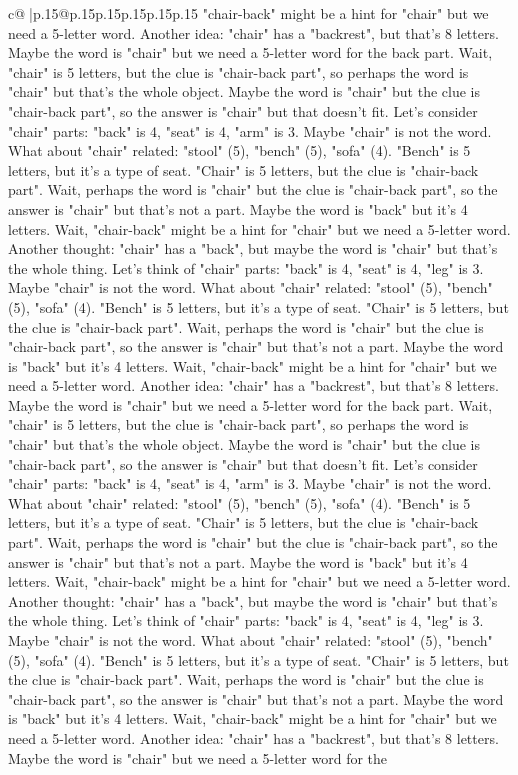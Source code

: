 \documentclass{article}
\begin{document}
{\begin{supertabular}{c@{$\;$}|p{.15\linewidth}@{}p{.15\linewidth}p{.15\linewidth}p{.15\linewidth}p{.15\linewidth}p{.15\linewidth}}
{{{"chair{-}back" might be a hint for "chair" but we need a 5{-}letter word. Another idea: "chair" has a "backrest", but that's 8 letters. Maybe the word is "chair" but we need a 5{-}letter word for the back part. Wait, "chair" is 5 letters, but the clue is "chair{-}back part", so perhaps the word is "chair" but that's the whole object. Maybe the word is "chair" but the clue is "chair{-}back part", so the answer is "chair" but that doesn't fit. Let's consider "chair" parts: "back" is 4, "seat" is 4, "arm" is 3. Maybe "chair" is not the word. What about "chair" related: "stool" (5), "bench" (5), "sofa" (4). "Bench" is 5 letters, but it's a type of seat. "Chair" is 5 letters, but the clue is "chair{-}back part". Wait, perhaps the word is "chair" but the clue is "chair{-}back part", so the answer is "chair" but that's not a part. Maybe the word is "back" but it's 4 letters. Wait, "chair{-}back" might be a hint for "chair" but we need a 5{-}letter word. Another thought: "chair" has a "back", but maybe the word is "chair" but that's the whole thing. Let's think of "chair" parts: "back" is 4, "seat" is 4, "leg" is 3. Maybe "chair" is not the word. What about "chair" related: "stool" (5), "bench" (5), "sofa" (4). "Bench" is 5 letters, but it's a type of seat. "Chair" is 5 letters, but the clue is "chair{-}back part". Wait, perhaps the word is "chair" but the clue is "chair{-}back part", so the answer is "chair" but that's not a part. Maybe the word is "back" but it's 4 letters. Wait, "chair{-}back" might be a hint for "chair" but we need a 5{-}letter word. Another idea: "chair" has a "backrest", but that's 8 letters. Maybe the word is "chair" but we need a 5{-}letter word for the back part. Wait, "chair" is 5 letters, but the clue is "chair{-}back part", so perhaps the word is "chair" but that's the whole object. Maybe the word is "chair" but the clue is "chair{-}back part", so the answer is "chair" but that doesn't fit. Let's consider "chair" parts: "back" is 4, "seat" is 4, "arm" is 3. Maybe "chair" is not the word. What about "chair" related: "stool" (5), "bench" (5), "sofa" (4). "Bench" is 5 letters, but it's a type of seat. "Chair" is 5 letters, but the clue is "chair{-}back part". Wait, perhaps the word is "chair" but the clue is "chair{-}back part", so the answer is "chair" but that's not a part. Maybe the word is "back" but it's 4 letters. Wait, "chair{-}back" might be a hint for "chair" but we need a 5{-}letter word. Another thought: "chair" has a "back", but maybe the word is "chair" but that's the whole thing. Let's think of "chair" parts: "back" is 4, "seat" is 4, "leg" is 3. Maybe "chair" is not the word. What about "chair" related: "stool" (5), "bench" (5), "sofa" (4). "Bench" is 5 letters, but it's a type of seat. "Chair" is 5 letters, but the clue is "chair{-}back part". Wait, perhaps the word is "chair" but the clue is "chair{-}back part", so the answer is "chair" but that's not a part. Maybe the word is "back" but it's 4 letters. Wait, "chair{-}back" might be a hint for "chair" but we need a 5{-}letter word. Another idea: "chair" has a "backrest", but that's 8 letters. Maybe the word is "chair" but we need a 5{-}letter word for the }}}
\end{supertabular}}
\end{document}
